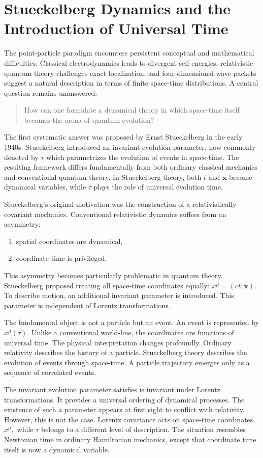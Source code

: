 \section{Stueckelberg Dynamics and the Introduction of Universal Time}
The point-particle paradigm encounters 
persistent conceptual and mathematical difficulties. Classical electrodynamics 
leads to divergent self-energies, relativistic quantum theory challenges exact 
localization, and four-dimensional wave packets suggest a natural description in
terms of finite space-time distributions.
A central question remains unanswered:
\begin{quote}
How can one formulate a dynamical theory in which space-time itself
    becomes the arena of quantum evolution?
\end{quote}
The first systematic answer was proposed by Ernst Stueckelberg in the early 1940s.
Stueckelberg introduced an invariant evolution parameter, now commonly denoted by $ \tau $
which parametrizes the evolution of events in space-time.
The resulting framework differs fundamentally from both ordinary classical mechanics
and conventional quantum theory.
In Stueckelberg theory, both $ t $ and $\mathbf{x}$
become dynamical variables, while $ \tau $
plays the role of universal evolution time.

Stueckelberg's original motivation was the construction of a relativistically
covariant mechanics.
Conventional relativistic dynamics suffers from an asymmetry:
\begin{enumerate}
\item spatial coordinates are dynamical,
\item coordinate time is privileged.
\end{enumerate}
This asymmetry becomes particularly problematic in quantum theory.
Stueckelberg proposed treating all space-time coordinates equally:
$x^\mu = (ct,\mathbf{x}).$
To describe motion, an additional invariant parameter is introduced.
This parameter is independent of Lorentz transformations.

The fundamental object is not a particle but an event.
An event is represented by $x^\mu(\tau).$
Unlike a conventional world-line,
the coordinates are functions of universal time.
The physical interpretation changes profoundly.
Ordinary relativity describes the history of a particle.
Stueckelberg theory describes the evolution of events through space-time.
A particle trajectory emerges only as a sequence of correlated events.

The invariant evolution parameter satisfies is invariant 
under Lorentz transformations.
It provides a universal ordering of dynamical processes.
The existence of such a parameter appears at first sight to conflict with relativity.
However, this is not the case.
Lorentz covariance acts on space-time coordinates,
$x^\mu,$ while $\tau$
belongs to a different level of description.
The situation resembles Newtonian time in ordinary Hamiltonian mechanics, 
except that coordinate time itself is now a dynamical variable.

